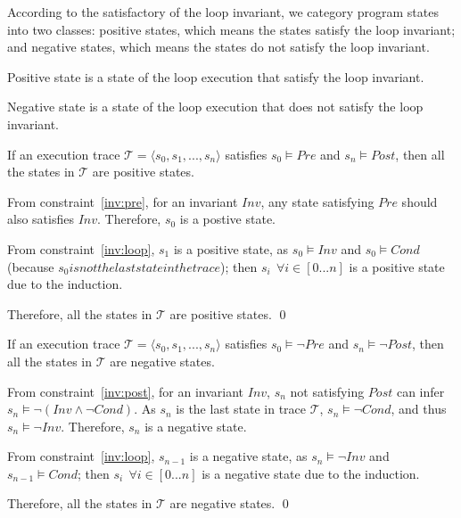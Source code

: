 According to the satisfactory of the loop invariant,
we category program states into two classes:
positive states, which means the states satisfy the loop invariant;
and negative states, which means the states do not satisfy the loop invariant.
\begin{definition}
Positive state is a state of the loop execution that satisfy the loop invariant.
\end{definition}
\begin{definition}
Negative state is a state of the loop execution that does not satisfy the loop invariant.
\end{definition}

\begin{theorem}
If an execution trace $\mathcal{T} = \langle s_0, s_1, ..., s_n\rangle$ satisfies $s_0 \models Pre$ and $s_n \models Post$,
then all the states in $\mathcal{T}$ are positive states.
\end{theorem}
From constraint~\ref{inv:pre}, for an invariant $Inv$, 
any state satisfying $Pre$ should also satisfies $Inv$.
Therefore, $s_0$ is a postive state.

From constraint~\ref{inv:loop}, $s_1$ is a positive state, as $s_0 \models Inv$ 
and  $s_0 \models Cond$ (because $s_0 is not the last state in the trace$);
then $s_i~~\forall i \in [0...n]$ is a positive state due to the induction.

Therefore, all the states in $\mathcal{T}$ are positive states. \hfill \qed



\begin{theorem}
If an execution trace $\mathcal{T} = \langle s_0, s_1, ..., s_n\rangle$ satisfies $s_0 \models \neg Pre$ and $s_n \models \neg Post$,
then all the states in $\mathcal{T}$ are negative states.
\end{theorem}
From constraint~\ref{inv:post}, for an invariant $Inv$, 
$s_n$ not satisfying $Post$ can infer $s_n \models \neg(Inv \wedge \neg Cond)$.
As $s_n$ is the last state in trace $\mathcal{T}$, $s_n \models \neg Cond$, and thus $s_n \models \neg Inv$.
Therefore, $s_n$ is a negative state.

From constraint~\ref{inv:loop}, $s_{n-1}$ is a negative state, as $s_n \models \neg Inv$ and $s_{n-1} \models Cond$;
then $s_i~~\forall i \in [0...n]$ is a negative state due to the induction.

Therefore, all the states in $\mathcal{T}$ are negative states. \hfill \qed


